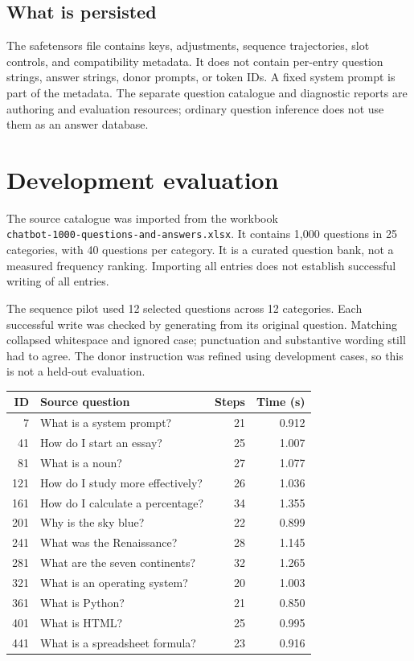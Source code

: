 \documentclass[manuscript,screen,nonacm]{acmart}
\begin{document}
\subsection{What is persisted}
The safetensors file contains keys, adjustments, sequence trajectories, slot controls, and compatibility metadata. It does not contain per-entry question strings, answer strings, donor prompts, or token IDs. A fixed system prompt is part of the metadata. The separate question catalogue and diagnostic reports are authoring and evaluation resources; ordinary question inference does not use them as an answer database.



\section{Development evaluation}
The source catalogue was imported from the workbook\\
\nolinkurl{chatbot-1000-questions-and-answers.xlsx}. It contains 1,000 questions in 25 categories, with 40 questions per category. It is a curated question bank, not a measured frequency ranking. Importing all entries does not establish successful writing of all entries.

The sequence pilot used 12 selected questions across 12 categories. Each successful write was checked by generating from its original question. Matching collapsed whitespace and ignored case; punctuation and substantive wording still had to agree. The donor instruction was refined using development cases, so this is not a held-out evaluation.

\begin{center}
\small
\begin{tabular}{r p{8.3cm} r r}
\toprule
ID & Source question & Steps & Time (s)\\
\midrule
7 & What is a system prompt? & 21 & 0.912\\
41 & How do I start an essay? & 25 & 1.007\\
81 & What is a noun? & 27 & 1.077\\
121 & How do I study more effectively? & 26 & 1.036\\
161 & How do I calculate a percentage? & 34 & 1.355\\
201 & Why is the sky blue? & 22 & 0.899\\
241 & What was the Renaissance? & 28 & 1.145\\
281 & What are the seven continents? & 32 & 1.265\\
321 & What is an operating system? & 20 & 1.003\\
361 & What is Python? & 21 & 0.850\\
401 & What is HTML? & 25 & 0.995\\
441 & What is a spreadsheet formula? & 23 & 0.916\\
\bottomrule
\end{tabular}
\end{center}
\end{document}
